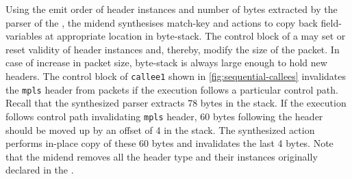 \documentclass[letterpaper,twocolumn,10pt]{article}
\begin{document}
%
Using the emit order of header instances and number of bytes extracted
by the parser of the \uprogram, the midend synthesises match-key and
actions to copy back field-variables at appropriate location in
byte-stack.  The control block of a \uprogram may set or reset
validity of header instances and, thereby, modify the size of the
packet. In case of increase in packet size, byte-stack is always large
enough to hold new headers. The control block of \texttt{callee1}
shown in \cref{fig:sequential-callees} invalidates the \texttt{mpls}
header from packets if the execution follows a particular control
path. Recall that the synthesized parser extracts 78 bytes in the
stack. If the execution follows control path invalidating
\texttt{mpls} header, 60 bytes following the header should be moved up
by an offset of 4 in the stack. The synthesized action performs
in-place copy of these 60 bytes and invalidates the last 4 bytes.
Note that the midend removes all the header type and their instances 
originally declared in the \uprogram.


\end{document}
